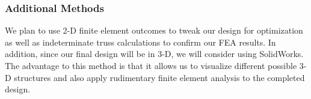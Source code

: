 \subsubsection{Additional Methods}

We plan to use 2-D finite element outcomes to tweak our design for optimization as well as indeterminate truss calculations to confirm our FEA results. 
In addition, since our final design will be in 3-D, we will consider using SolidWorks. 
The advantage to this method is that it allows us to visualize different possible 3-D structures and also apply rudimentary finite element analysis to the completed design. 